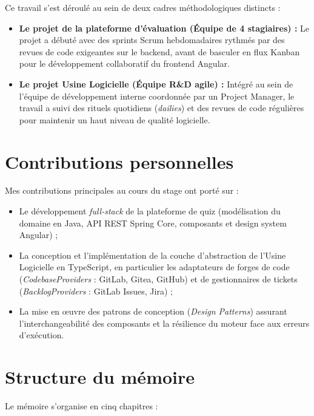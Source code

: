 \documentclass{tnreport}
\begin{document}
Ce travail s'est déroulé au sein de deux cadres méthodologiques distincts :

\begin{itemize}
    \item \textbf{Le projet de la plateforme d'évaluation (Équipe de 4 stagiaires) :} Le projet a débuté avec des sprints Scrum hebdomadaires rythmés par des revues de code exigeantes sur le backend, avant de basculer en flux Kanban pour le développement collaboratif du frontend Angular.
    \item \textbf{Le projet Usine Logicielle (Équipe R\&D agile) :} Intégré au sein de l'équipe de développement interne coordonnée par un Project Manager, le travail a suivi des rituels quotidiens (\textit{dailies}) et des revues de code régulières pour maintenir un haut niveau de qualité logicielle.
\end{itemize}

\section*{Contributions personnelles}

Mes contributions principales au cours du stage ont porté sur :
\begin{itemize}
    \item Le développement \textit{full-stack} de la plateforme de quiz (modélisation du domaine en Java, API REST Spring Core, composants et design system Angular) ;
    \item La conception et l'implémentation de la couche d'abstraction de l'Usine Logicielle en TypeScript, en particulier les adaptateurs de forges de code (\textit{CodebaseProviders} : GitLab, Gitea, GitHub) et de gestionnaires de tickets (\textit{BacklogProviders} : GitLab Issues, Jira) ;
    \item La mise en œuvre des patrons de conception (\textit{Design Patterns}) assurant l'interchangeabilité des composants et la résilience du moteur face aux erreurs d'exécution.
\end{itemize}

\section*{Structure du mémoire}

Le mémoire s'organise en cinq chapitres :
\end{document}
